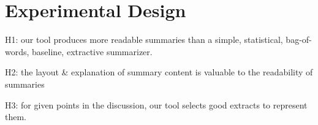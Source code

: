 \chapter{Experimental Design\label{chap:experimental-design}}
  H1: our tool produces more readable summaries than a simple, statistical, bag-of-words, baseline, extractive summarizer.

  H2: the layout \& explanation of summary content is valuable to the readability of summaries

  H3: for given points in the discussion, our tool selects good extracts to represent them.
